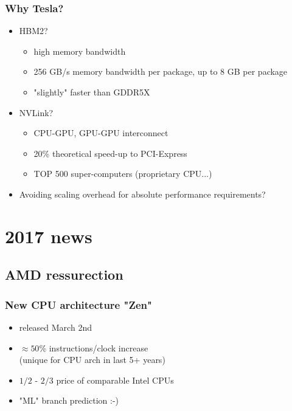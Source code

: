 \documentclass{beamer}
\begin{document}
			\begin{frame}
				\frametitle{Why Tesla?}			
					\begin{itemize} 
						\item HBM2?
							\begin{itemize} 
								\item high memory bandwidth
                                \item 256 GB/s memory bandwidth per package, up to 8 GB per package
								\item "slightly" faster than GDDR5X
							\end{itemize} 
                        \item NVLink?
							\begin{itemize} 
								\item CPU-GPU, GPU-GPU interconnect
								\item 20\% theoretical speed-up to PCI-Express
								\item TOP 500 super-computers (proprietary CPU...)
							\end{itemize}
                        \item Avoiding scaling overhead for absolute performance requirements?
					\end{itemize} 
			\end{frame}
			
	\section{2017 news}
		\subsection{AMD ressurection}
		
			\begin{frame}
				\frametitle{New CPU architecture "Zen"}			
				\begin{itemize} 
					\item released March 2nd						
					\item $\approx 50\%$ instructions/clock increase\\
                        (unique for CPU arch in last 5+ years)
					\item $1/2$ - $2/3$ price of comparable Intel CPUs
					\item "ML" branch prediction :-)
				\end{itemize} 
			\end{frame}
			
\end{document}
